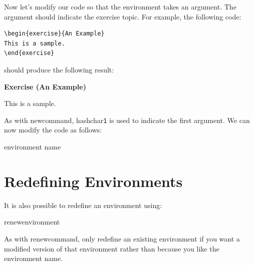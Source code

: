 Now let's modify our code so that the environment takes an
argument.  The argument should indicate the exercise topic.
For example, the following code:
\begin{code}
\begin{verbatim}
\begin{exercise}{An Example}
This is a sample.
\end{exercise}
\end{verbatim}
\end{code}%
should produce the following result:
\begin{result}
\par\vspace{\baselineskip}\noindent\textbf{Exercise (An Example)}
\begin{itshape}\par\vspace{\baselineskip}\noindent
This is a sample.
\end{itshape}
\end{result}%
As with \gls{newcommand}, \gls{hashchar}\texttt{1} is
used to indicate the first argument.  We can now modify the code as
follows:
\begin{code}\obeyspaces
{} environment name\newline
{}\newline
{}
\end{code}

\section{Redefining Environments}
\label{sec:renewenv}

It is also possible to redefine an environment using:
\begin{definition}[\linewidth]
\gls{renewenvironment}
\end{definition}%
As with \gls{renewcommand}, only redefine an existing environment if
you want a modified version of that environment rather than because
you like the environment name.

